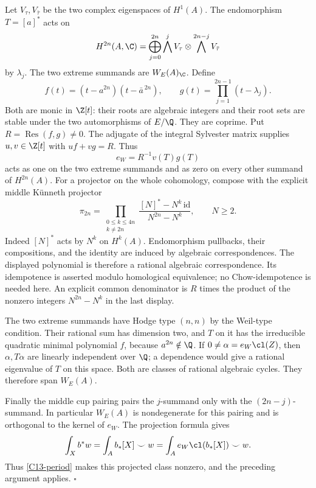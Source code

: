 Let $V_\tau,V_{\bar\tau}$ be the two complex eigenspaces of $H^1(A)$.
The endomorphism $T=[a]^*$ acts on
\[
 H^{2n}(A,\C)=\bigoplus_{j=0}^{2n}
       \bigwedge^jV_\tau\otimes\bigwedge^{2n-j}V_{\bar\tau}
\]
by $\lambda_j$. The two extreme summands are
$W_E(A)_\C$. Define
\[
 f(t)=(t-a^{2n})(t-\bar a^{\,2n}),\qquad
 g(t)=\prod_{j=1}^{2n-1}(t-\lambda_j).
\]
Both are monic in $\Z[t]$: their roots are algebraic integers and
their root sets are stable under the two automorphisms of $E/\Q$.
They are coprime. Put $R=\operatorname{Res}(f,g)\ne0$.
The adjugate of the integral Sylvester matrix supplies
$u,v\in\Z[t]$ with $uf+vg=R$. Thus
\[
 e_W=R^{-1}v(T)g(T)
\]
acts as one on the two extreme summands and as zero on every other
summand of $H^{2n}(A)$. For a projector on the whole cohomology, compose
with the explicit middle K\"unneth projector
\[
 \pi_{2n}=
 \prod_{\substack{0\le k\le4n\\k\ne2n}}
   \frac{[N]^*-N^k\,\mathrm{id}}{N^{2n}-N^k},\qquad N\ge2.
\]
Indeed $[N]^*$ acts by $N^k$ on $H^k(A)$. Endomorphism pullbacks,
their compositions, and the identity are induced by algebraic
correspondences. The displayed polynomial is therefore a rational
algebraic correspondence. Its idempotence is asserted modulo
homological equivalence; no Chow-idempotence is needed here.
An explicit common denominator is $R$ times the product of the
nonzero integers $N^{2n}-N^k$ in the last display.

The two extreme summands have Hodge type $(n,n)$ by the Weil-type
condition. Their rational sum has dimension two, and $T$ on it has
the irreducible quadratic minimal polynomial $f$, because
$a^{2n}\notin\Q$. If $0\ne\alpha=e_W\cl(Z)$, then
$\alpha,T\alpha$ are linearly independent over $\Q$; a dependence
would give a rational eigenvalue of $T$ on this space. Both are
classes of rational algebraic cycles. They therefore span $W_E(A)$.

Finally the middle cup pairing pairs the $j$-summand only with the
$(2n-j)$-summand. In particular $W_E(A)$ is nondegenerate for this
pairing and is orthogonal to the kernel of $e_W$. The projection
formula gives
\[
 \int_X b^*w=\int_A b_*[X]\smile w
           =\int_A e_W\cl(b_*[X])\smile w.
\]
Thus \eqref{C13-period} makes this projected class nonzero, and the
preceding argument applies. $\square$


